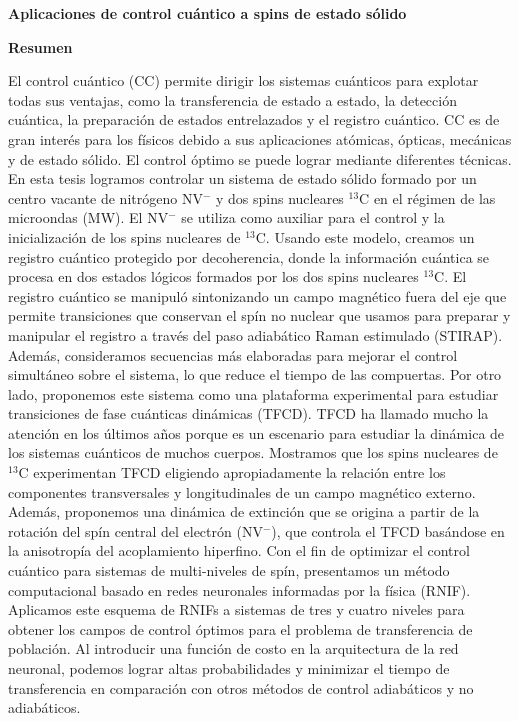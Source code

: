 \newpage
\begin{center}
    \Large
    \textbf{Aplicaciones de control cuántico a spins de estado sólido}
    
    \large
    \vspace{0.4cm}
    \newauthor
    \vspace{0.9cm}
    
    \textbf{Resumen}\\
\end{center}

El control cuántico (CC) permite dirigir los sistemas cuánticos para explotar todas sus ventajas, como la transferencia de estado a estado, la detección cuántica, la preparación de estados entrelazados y el registro cuántico. CC es de gran interés para los físicos debido a sus aplicaciones atómicas, ópticas, mecánicas y de estado sólido. El control óptimo se puede lograr mediante diferentes técnicas. En esta tesis logramos controlar un sistema de estado sólido formado por un centro vacante de nitrógeno NV$^{-}$ y dos spins nucleares $^{13}$C en el régimen de las microondas (MW). El NV$^{-}$ se utiliza como auxiliar para el control y la inicialización de los spins nucleares de $^{13}$C. Usando este modelo, creamos un registro cuántico protegido por decoherencia, donde la información cuántica se procesa en dos estados lógicos formados por los dos spins nucleares $^{13}$C. El registro cuántico se manipuló sintonizando un campo magnético fuera del eje que permite transiciones que conservan el spín no nuclear que usamos para preparar y manipular el registro a través del paso adiabático Raman estimulado (STIRAP). Además, consideramos secuencias más elaboradas para mejorar el control simultáneo sobre el sistema, lo que reduce el tiempo de las compuertas. Por otro lado, proponemos este sistema como una plataforma experimental para estudiar transiciones de fase cuánticas dinámicas (TFCD). TFCD ha llamado mucho la atención en los últimos años porque es un escenario para estudiar la dinámica de los sistemas cuánticos de muchos cuerpos. Mostramos que los spins nucleares de $^{13}$C experimentan TFCD eligiendo apropiadamente la relación entre los componentes transversales y longitudinales de un campo magnético externo. Además, proponemos una dinámica de extinción que se origina a partir de la rotación del spín central del electrón (NV$^{-}$), que controla el TFCD basándose en la anisotropía del acoplamiento hiperfino. Con el fin de optimizar el control cuántico para sistemas de   multi-niveles de spín, presentamos un método computacional basado en redes neuronales informadas por la física (RNIF). Aplicamos este esquema de RNIFs a sistemas de tres y cuatro niveles para obtener los campos de control óptimos para el problema de transferencia de población. Al introducir una función de costo en la arquitectura de la red neuronal, podemos lograr altas probabilidades y minimizar el tiempo de transferencia en comparación con otros métodos de control adiabáticos y no adiabáticos.